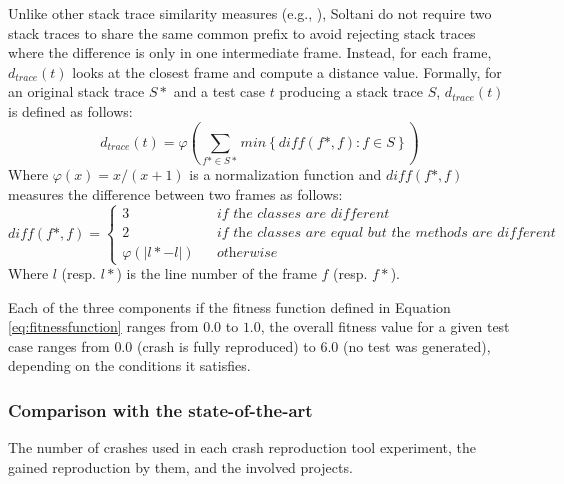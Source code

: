 Unlike other stack trace similarity measures (e.g., \cite{Rossler2013}), Soltani \etal \cite{Soltani2018a} do not require two stack traces to share the same common prefix to avoid rejecting stack traces where the difference is only in one intermediate frame. Instead, for each frame, $d_{trace}(t)$ looks at the closest frame and compute a distance value. Formally, for an original stack trace $S*$ and a test case $t$ producing a stack trace $S$, $d_{trace}(t)$ is defined as follows:
%
\begin{equation}
d_{trace}(t) = \varphi \left( \sum_{f* \in S*} min \left\lbrace \mathit{diff}(f*, f) : f \in S \right\rbrace \right)
\end{equation}
%
Where $\varphi (x) = x / (x+1)$ is a normalization function \cite{McMinn2004} and $\mathit{diff}(f*, f)$ measures the difference between two frames as follows: 
%
\begin{equation}
\mathit{diff}(f*, f) = 
\left\{
  \begin{array}{lcr}
    3 && \textit{if the classes are different}\\
    2  && \textit{if the classes are equal but the methods are different}\\
     \varphi \left( \vert l* - l \vert \right)   && \textit{otherwise}
  \end{array}
\right.
\end{equation}
%
Where $l$ (resp. $l*$) is the line number of the frame $f$ (resp. $f*$).

Each of the three components if the fitness function defined in Equation \ref{eq:fitnessfunction} ranges from $0.0$ to $1.0$, the overall fitness value for a given test case ranges from $0.0$ (crash is fully reproduced) to $6.0$ (no test was generated), depending on the conditions it satisfies. 

\subsubsection{Comparison with the state-of-the-art}


\begin{table*}[t]
	\centering
	\caption{The number of crashes used in each crash reproduction tool experiment, the gained reproduction by them, and the involved projects.}
	\label{tab:background:represults}
	
\end{table*}

